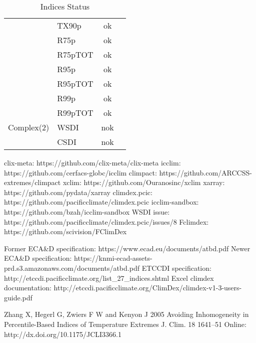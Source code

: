 \documentclass[a4paper,11pt]{article}
\begin{document}
\begin{table}[h]
\begin{tabular}{l l c c}
                     &  TX90p    &   ok             &                       \\
                     &  R75p     &   ok             &                       \\
                     &  R75pTOT  &   ok             &                       \\
                     &  R95p     &   ok             &                       \\
                     &  R95pTOT  &   ok             &                       \\
                     &  R99p     &   ok             &                       \\
                     &  R99pTOT  &   ok             &                       \\
        Complex(2)   &  WSDI     &   nok            &                       \\
                     &  CSDI     &   nok            &                       \\
    \end{tabular}
    \label{table/indices_status}
    \caption{Indices Status}
    \end{table}

\clearpage
\begin{thebibliography}{1}
        clix-meta: https://github.com/clix-meta/clix-meta
        icclim: https://github.com/cerfacs-globc/icclim
        climpact: https://github.com/ARCCSS-extremes/climpact
        xclim: https://github.com/Ouranosinc/xclim
        xarray: https://github.com/pydata/xarray
        climdex.pcic: https://github.com/pacificclimate/climdex.pcic    
        icclim-sandbox: https://github.com/bzah/icclim-sandbox
        WSDI issue: https://github.com/pacificclimate/climdex.pcic/issues/8
        Fclimdex: https://github.com/scivision/FClimDex
        
        Former ECA\&D specification: https://www.ecad.eu/documents/atbd.pdf
        Newer ECA\&D specification: https://knmi-ecad-assets-prd.s3.amazonaws.com/documents/atbd.pdf
        ETCCDI specification: http://etccdi.pacificclimate.org/list\_27\_indices.shtml
        Excel climdex documentation: http://etccdi.pacificclimate.org/ClimDex/climdex-v1-3-users-guide.pdf

        Zhang X, Hegerl G, Zwiers F W and Kenyon J 2005 Avoiding Inhomogeneity in Percentile-Based Indices of Temperature Extremes J. Clim. 18 1641–51 Online: http://dx.doi.org/10.1175/JCLI3366.1
\end{thebibliography}
\end{document}
